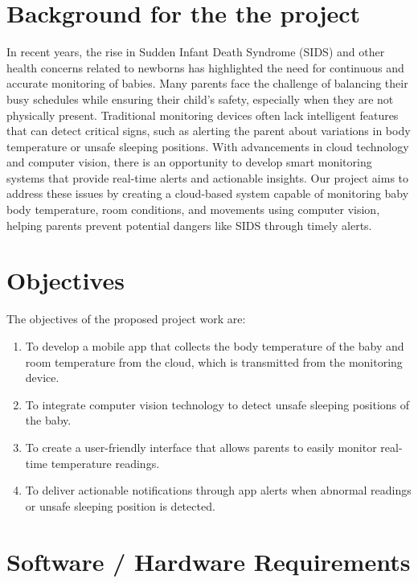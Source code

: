 \documentclass[12pt,a4paper]{report}
\begin{document}
\section*{Background for the  the project}
In recent years, the rise in Sudden Infant Death Syndrome (SIDS)
 and other health concerns related to newborns has highlighted 
 the need for continuous and accurate monitoring of babies\cite{1}. 
 Many parents face the challenge of balancing their busy 
 schedules while ensuring their child’s safety, especially when 
 they are not physically present. Traditional monitoring devices
  often lack intelligent features that can detect critical signs,
   such as alerting the parent about variations in body temperature or unsafe sleeping positions. With 
   advancements in cloud technology and computer vision, there 
   is an opportunity to develop smart monitoring systems that 
   provide real-time alerts and actionable insights. Our project aims to address these issues by 
   creating a cloud-based system capable of monitoring baby 
   body temperature, room conditions, and movements using 
   computer vision, helping parents prevent potential dangers 
   like SIDS through timely alerts.

\section*{Objectives }
The objectives of the proposed project work are:
\begin{enumerate}
    \item To develop a mobile app that collects the body temperature of the baby and room temperature from the cloud, which is transmitted from the monitoring device.
    \item To integrate computer vision technology to detect unsafe sleeping positions of the baby.
    \item To create a user-friendly interface that allows parents to easily monitor real-time temperature readings.
    \item To deliver actionable notifications through app alerts when abnormal readings or unsafe sleeping position is detected.
\end{enumerate}

\section*{Software / Hardware Requirements}
\end{document}
